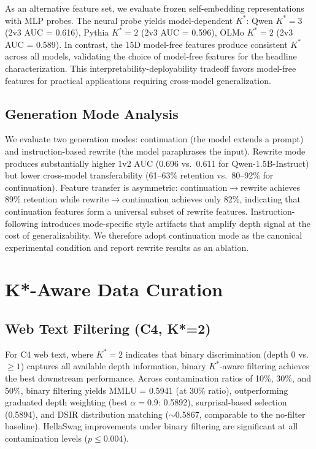 \documentclass[11pt,a4paper]{article}
\begin{document}
As an alternative feature set, we evaluate frozen self-embedding representations with MLP probes. The neural probe yields model-dependent $K^*$: Qwen $K^*{=}3$ (2v3 AUC = 0.616), Pythia $K^*{=}2$ (2v3 AUC = 0.596), OLMo $K^*{=}2$ (2v3 AUC = 0.589). In contrast, the 15D model-free features produce consistent $K^*$ across all models, validating the choice of model-free features for the headline characterization. This interpretability-deployability tradeoff favors model-free features for practical applications requiring cross-model generalization.

\subsection{Generation Mode Analysis}

We evaluate two generation modes: continuation (the model extends a prompt) and instruction-based rewrite (the model paraphrases the input). Rewrite mode produces substantially higher 1v2 AUC (0.696 vs.\ 0.611 for Qwen-1.5B-Instruct) but lower cross-model transferability (61--63\% retention vs.\ 80--92\% for continuation). Feature transfer is asymmetric: continuation$\to$rewrite achieves 89\% retention while rewrite$\to$continuation achieves only 82\%, indicating that continuation features form a universal subset of rewrite features. Instruction-following introduces mode-specific style artifacts that amplify depth signal at the cost of generalizability. We therefore adopt continuation mode as the canonical experimental condition and report rewrite results as an ablation.


\section{K*-Aware Data Curation}
\label{sec:curation}

\subsection{Web Text Filtering (C4, K*=2)}

For C4 web text, where $K^*{=}2$ indicates that binary discrimination (depth 0 vs.\ $\geq 1$) captures all available depth information, binary $K^*$-aware filtering achieves the best downstream performance. Across contamination ratios of 10\%, 30\%, and 50\%, binary filtering yields MMLU = 0.5941 (at 30\% ratio), outperforming graduated depth weighting (best $\alpha{=}0.9$: 0.5892), surprisal-based selection (0.5894), and DSIR distribution matching ($\sim$0.5867, comparable to the no-filter baseline). HellaSwag improvements under binary filtering are significant at all contamination levels ($p \leq 0.004$).
\end{document}
